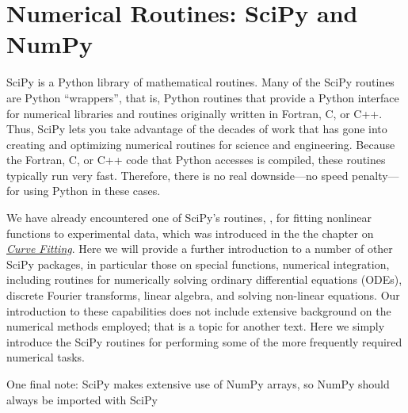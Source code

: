 \documentclass[letterpaper,10pt,english]{sphinxmanual}
\begin{document}
\begin{enumerate}
\begin{enumerate}
\end{enumerate}

\end{enumerate}


\chapter{Numerical Routines: SciPy and NumPy}
\label{chap9/chap9_scipy::doc}\label{chap9/chap9_scipy:numerical-routines-scipy-and-numpy}\label{chap9/chap9_scipy:chap9}
SciPy is a Python library of mathematical routines.  Many of the SciPy routines are Python ``wrappers'', that is, Python routines that provide a Python interface for numerical libraries and routines originally written in Fortran, C, or C++.  Thus, SciPy lets you take advantage of the decades of work that has gone into creating and optimizing numerical routines for science and engineering.  Because the Fortran, C, or C++ code that Python accesses is compiled, these routines typically run very fast.  Therefore, there is no real downside---no speed penalty---for using Python in these cases.

We have already encountered one of SciPy's routines, , for fitting nonlinear functions to experimental data, which was introduced in the the chapter on {\hyperref[chap8/chap8_fitting:chap8]{\emph{Curve Fitting}}}.   Here we will provide a further introduction to a number of other SciPy packages, in particular those on special functions, numerical integration, including routines for numerically solving ordinary differential equations (ODEs), discrete Fourier transforms, linear algebra, and solving non-linear equations.  Our introduction to these capabilities does not include extensive background on the numerical methods employed; that is a topic for another text.  Here we simply introduce the SciPy routines for performing some of the more frequently required numerical tasks.

One final note:  SciPy makes extensive use of NumPy arrays, so NumPy should always be imported with SciPy

\end{document}

